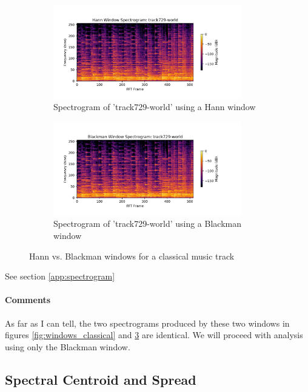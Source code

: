 \documentclass[11pt,a4paper]{article}
\begin{document}
\begin{figure}[tb]
	\centering
	\begin{subfigure}[t]{\hsize}
		\centering
		\includegraphics[width=0.9\textwidth]{powerHann_track729-world}
		\caption{Spectrogram of 'track729-world' using a Hann window}
		\label{fig:hann_world}
	\end{subfigure}
	\begin{subfigure}[t]{\hsize}
		\centering
		\includegraphics[width=0.9\textwidth]{powerBlack_track729-world}
		\caption{Spectrogram of 'track729-world' using a Blackman window}
		\label{fig:black_world}
	\end{subfigure}
	\caption{Hann vs. Blackman windows for a classical music track}
	\label{fig:windows_world}
\end{figure}

See section \ref{app:spectrogram}

\paragraph{Comments} As far as I can tell, the two spectrograms produced by these two windows in figures \ref{fig:windows_classical} and \ref{fig:windows_world} are identical. We will proceed with analysis using only the Blackman window.

\pagebreak

\subsection{Spectral Centroid and Spread}
\end{document}
